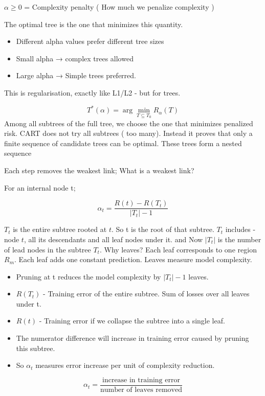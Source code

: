 \documentclass[10pt,a4paper]{article}
\begin{document}
		$\alpha \ge 0$ = Complexity penalty ( How much we penalize complexity )
	
		The optimal tree is the one that minimizes this quantity.
	
		\begin{itemize}
			\item Different alpha values prefer different tree sizes
			\item Small alpha → complex trees allowed
			\item Large alpha → Simple trees preferred.
		\end{itemize}
	
		This is regularisation, exactly like L1/L2 - but for trees.
	
		$$	T^*(\alpha) = \arg\min_{T \subseteq T_0} R_\alpha(T)
		$$
		Among all subtrees of the full tree, we choose the one that minimizes penalized risk. CART does not try all subtrees ( too many). Instead it proves that only a finite sequence of candidate trees can be optimal. These trees form a nested sequence
	
	
		Each step removes the weakest link; What is a weakest link?
	
		For an internal node t;
	
	
		$$		\alpha_t = \frac{R(t) - R(T_t)}{|T_t| - 1}
		$$
	
		$T_t$ is the entire subtree rooted at $t$. So t is the root of that subtree. $T_t$  includes - node $t$, all its descendants and all leaf nodes under it. and Now $|T_t|$ is the number of lead nodes in the subtree $T_t.$ Why leaves? Each leaf corresponds to one region $R_m$. Each leaf adds one constant prediction. Leaves measure model complexity.
	
		\begin{itemize}
			\item Pruning at t reduces the model complexity by $|T_t| - 1$ leaves.
			\item $R(T_t)$ - Training error of the entire subtree. Sum of losses over all leaves under t.
			\item $R(t)$ - Training error if we collapse the subtree into a single leaf.
			\item The numerator difference will increase in training error caused by pruning this subtree.
			\item So $\alpha_t$ measures error increase per unit of complexity reduction.
		\end{itemize}
	
	
		$$		\alpha_t = \frac{\text{increase in training error}}{\text{number of leaves removed}}
		$$
	
\end{document}
